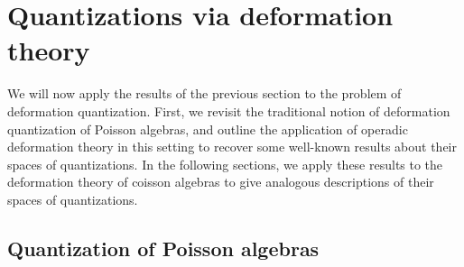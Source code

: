 \documentclass[11pt]{amsart}
\numberwithin{equation}{section}
\newtheorem{prop}[theo]{Proposition}
\theoremstyle{definition}
\newcommand{\bb}{\mathbb}
\newcommand{\mc}{\mathcal}
\newcommand{\mf}{\mathfrak}
\newcommand{\Def}{{\textup{Def}}}
\newcommand{\Rh}{{\mathcal{R}_\hbar}}
\newcommand{\Ph}{{\mathcal{P}_\hbar}}
\newcommand{\Qh}{{\mathcal{Q}_\hbar}}
\newcommand{\K}{{\bb K}}
\newcommand{\Obs}{{\textup{Obs}}}
\newcommand{\Alg}{{\textup{Alg}}}
\newcommand{\0}{{\textbf{0}}}
\newcommand{\g}{{\mf{g}}}
\def \mf{\mathfrak}
\begin{document}
%
%
%
%
%
%
%
%
%
%
%
%
%
%



\section{Quantizations via deformation theory}\label{quantsec}

We will now apply the results of the previous section to the problem of deformation quantization. First, we revisit the traditional notion of deformation quantization of Poisson algebras, and outline the application of operadic deformation theory in this setting to recover some well-known results about their spaces of quantizations. In the following sections, we apply these results to the deformation theory of coisson algebras to give analogous descriptions of their spaces of quantizations.

\subsection{Quantization of Poisson algebras}\label{Poisquantsec}
\end{document}
